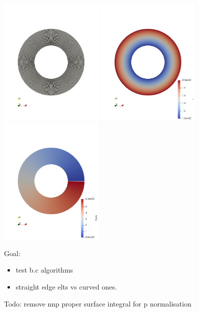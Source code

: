 \begin{center}
\includegraphics[width=5cm]{./python_codes/fieldstone_151/images/mesh}
\includegraphics[width=5cm]{./python_codes/fieldstone_151/images/r}
\includegraphics[width=5cm]{./python_codes/fieldstone_151/images/theta}
\end{center}


Goal: 
\begin{itemize}
\item test b.c algorithms
\item straight edge elts vs curved ones.
\end{itemize}

Todo:
remove nnp
proper surface integral for p normalisation

